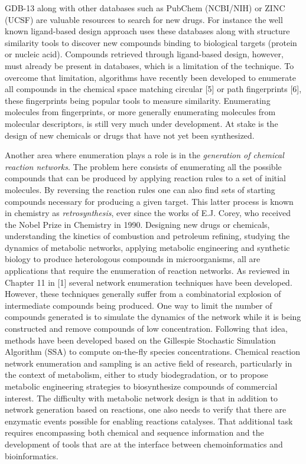 \documentclass{sig-alternate}
\begin{document}
GDB-13 along with other databases such as PubChem (NCBI/NIH) or ZINC
(UCSF) are valuable resources to search for new drugs. For instance
the well known ligand-based design approach uses these
databases along with structure similarity tools to discover new
compounds binding to biological targets (protein or nucleic
acid). Compounds retrieved through ligand-based design, however, must
already be present in databases, which is a limitation of the
technique. To overcome that limitation, algorithms have recently been
developed to enumerate all compounds in the chemical space matching
circular [5] or path fingerprints [6], these fingerprints being
popular tools to measure similarity. Enumerating molecules from
fingerprints, or more generally enumerating molecules from molecular
descriptors, is still very much under development. At stake is the
design of new chemicals or drugs that have not yet been synthesized.

Another area where enumeration plays a role is in the \emph{generation
  of chemical reaction networks}. The problem here consists of
enumerating all the possible compounds that can be produced by
applying reaction rules to a set of initial molecules. By reversing
the reaction rules one can also find sets of starting compounds
necessary for producing a given target. This latter process is known
in chemistry as \emph{retrosynthesis}, ever since the works of
E.J. Corey, who received the Nobel Prize in Chemistry in
1990. Designing new drugs or chemicals, understanding the kinetics of
combustion and petroleum refining, studying the dynamics of metabolic
networks, applying metabolic engineering and synthetic biology to
produce heterologous compounds in microorganisms, all are applications
that require the enumeration of reaction networks. As reviewed in
Chapter 11 in [1] several network enumeration techniques have been
developed. However, these techniques generally suffer from a
combinatorial explosion of intermediate compounds being produced. One
way to limit the number of compounds generated is to simulate the
dynamics of the network while it is being constructed and remove
compounds of low concentration. Following that idea, methods have been
developed based on the Gillespie Stochastic Simulation Algorithm (SSA)
to compute on-the-fly species concentrations. Chemical reaction
network enumeration and sampling is an active field of research,
particularly in the context of metabolism, either to study
biodegradation, or to propose metabolic engineering strategies to
biosynthesize compounds of commercial interest. The difficulty with
metabolic network design is that in addition to network generation
based on reactions, one also needs to verify that there are enzymatic
events possible for enabling reactions catalyses. That additional task
requires encompassing both chemical and sequence information and the
development of tools that are at the interface between
chemoinformatics and bioinformatics.
\end{document}
